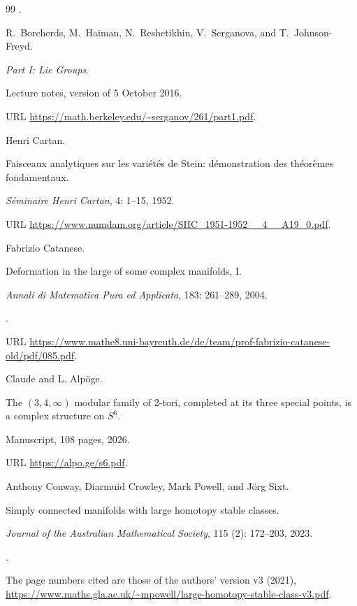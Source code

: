 \documentclass[11pt,a4paper]{article}
\numberwithin{equation}{section}
\theoremstyle{definition}
\begin{document}
\begin{thebibliography}{99}
\newblock {}.

R.~Borcherds, M.~Haiman, N.~Reshetikhin, V.~Serganova, and T.~Johnson-Freyd.

\newblock \emph{Part I: Lie Groups}.

\newblock Lecture notes, version of 5 October 2016.

\newblock URL \url{https://math.berkeley.edu/~serganov/261/part1.pdf}.

Henri Cartan.

\newblock Faisceaux analytiques sur les vari{\'e}t{\'e}s de {Stein}:
  d{\'e}monstration des th{\'e}or{\`e}mes fondamentaux.

\newblock \emph{S{\'e}minaire Henri Cartan}, 4: 1--15, 1952.

\newblock URL \url{https://www.numdam.org/article/SHC_1951-1952__4__A19_0.pdf}.

Fabrizio Catanese.

\newblock Deformation in the large of some complex manifolds, {I}.

\newblock \emph{Annali di Matematica Pura ed Applicata}, 183:
  261--289, 2004.

\newblock {}.

\newblock URL
  \url{https://www.mathe8.uni-bayreuth.de/de/team/prof-fabrizio-catanese-old/pdf/085.pdf}.

{Claude} and {L. Alp{\"o}ge}.

\newblock The $(3,4,\infty)$ modular family of 2-tori, completed at its three
  special points, is a complex structure on $S^6$.

\newblock Manuscript, 108 pages, 2026.

\newblock URL \url{https://alpo.ge/s6.pdf}.

Anthony Conway, Diarmuid Crowley, Mark Powell, and J{\"o}rg Sixt.

\newblock Simply connected manifolds with large homotopy stable classes.

\newblock \emph{Journal of the Australian Mathematical Society}, 115 (2): 172--203, 2023.

\newblock {}.

\newblock The page numbers cited are those of the authors' version v3 (2021), \url{https://www.maths.gla.ac.uk/~mpowell/large-homotopy-stable-class-v3.pdf}.


\end{thebibliography}
\end{document}
